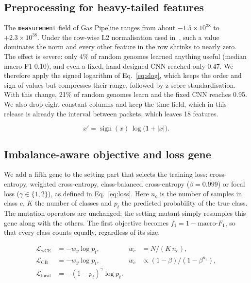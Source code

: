 \documentclass[10pt,twocolumn,letterpaper]{article}
\begin{document}
\subsection{Preprocessing for heavy-tailed features}
The \texttt{measurement} field of Gas Pipeline ranges from about
$-1.5\times10^{38}$ to $+2.3\times10^{38}$. Under the row-wise L2
normalisation used in~\cite{lu2025modeo}, such a value dominates the norm
and every other feature in the row shrinks to nearly zero. The effect is
severe: only 4\% of random genomes learned anything useful (median
macro-F1 0.10), and even a fixed, hand-designed CNN reached only 0.47. We
therefore apply the signed logarithm of Eq.~\eqref{eq:slog}, which keeps
the order and sign of values but compresses their range, followed by
z-score standardisation. With this change, 21\% of random genomes learn
and the fixed CNN reaches 0.95. We also drop eight constant columns and keep the
time field, which in this release is already the interval between packets,
which leaves 18 features.

\begin{equation}\label{eq:slog}
x' = \operatorname{sign}(x)\,\log\!\big(1 + |x|\big).
\end{equation}
\subsection{Imbalance-aware objective and loss gene}
We add a fifth gene to the setting part that selects the training loss:
cross-entropy, weighted cross-entropy, class-balanced cross-entropy
($\beta = 0.999$) or focal loss ($\gamma \in \{1, 2\}$), as defined in
Eq.~\eqref{eq:loss}. Here $n_c$ is the number of samples in class $c$,
$K$ the number of classes and $p_t$ the predicted probability of the true
class. The mutation operators are unchanged; the setting mutant simply
resamples this gene along with the others. The first objective becomes
$f_1 = 1 - \text{macro-}F_1$, so that every class counts equally,
regardless of its size.

\begin{equation}\label{eq:loss}
\begin{aligned}
\mathcal{L}_{\mathrm{wCE}} &= -w_y \log p_t, & w_c &= N/(K\,n_c),\\
\mathcal{L}_{\mathrm{CB}} &= -w_y \log p_t, & w_c &\propto (1-\beta)/(1-\beta^{n_c}),\\
\mathcal{L}_{\mathrm{focal}} &= -(1-p_t)^{\gamma} \log p_t. &&
\end{aligned}
\end{equation}
\end{document}
